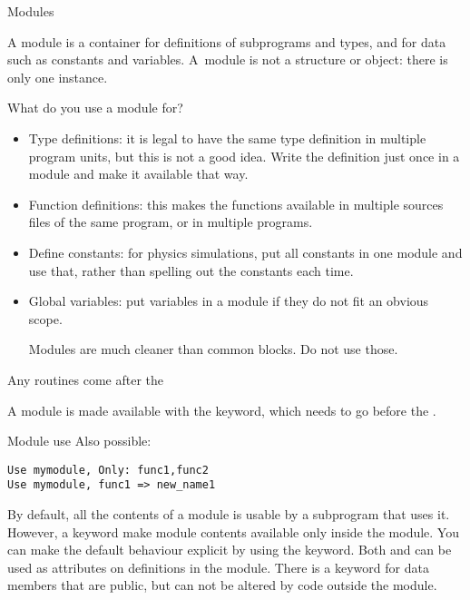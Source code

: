  {Modules}
\label{sec:modulef}

A module is a container for definitions of subprograms and types, and
for data such as constants and variables. A~module is not a 
structure or object: there is only one instance.

What do you use a module for?
\begin{itemize}
\item Type definitions: it is legal to have the same type definition
  in multiple program units, but this is not a good idea. 
  Write the definition just once in a module and make it available
  that way.
\item Function definitions: this makes the functions available in multiple
  sources files of the same program, or in multiple programs.
\item Define constants: for physics simulations, put all constants in
  one module and use that, rather than spelling out the constants each
  time.
\item Global variables: put variables in a module if they do not fit
  an obvious scope.
  \begin{f77note}
  Modules are much cleaner than common blocks. Do not use those.
  \end{f77note}
\end{itemize}
%

Any routines come after the 

A module is made available with the  keyword, which
needs to go before the .
%
\begin{block}{Module use}
  \label{sl:moduleuse}
  Also possible:
\begin{lstlisting}
Use mymodule, Only: func1,func2
Use mymodule, func1 => new_name1
\end{lstlisting}
\end{block}

By default, all the contents of a module is usable by a subprogram
that uses it. However, a keyword  make module
contents available only inside the module.
You can make the default behaviour explicit by using the
 keyword. Both  and  can be used as
attributes on definitions in the module.
There is a keyword  for data members that
are public, but can not be altered by code outside the module.

